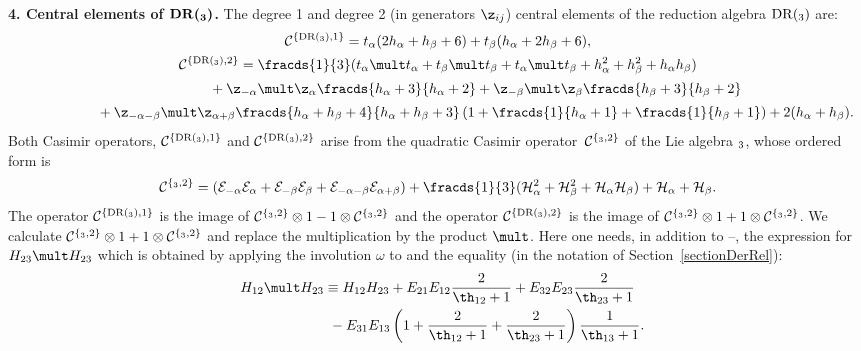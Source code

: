\documentclass[pdftex]{sigma}
\def\a{\alpha}\def\Ar{{\rm A}}\def\Ab{\bar{\rm A}}\def\b{\beta}\def\bb{\mathfrak{b}}
\numberwithin{equation}{section}
\begin{document}
{\bf 4. Central elements of $\boldsymbol{{\mathrm{DR}}(\sl_3)}$.} The degree 1 and degree 2 (in generators $\z_{ij}$) central elements of the
reduction algebra  ${\mathrm{DR}}(\sl_3)$ are:
\begin{gather*}
 {\mathcal{C}}^{\{ {\mathrm{DR}}(\sl_3),1\} }=t_\a (2h_\a +h_\b +6)+t_\b (h_\a +2h_\b +6) ,\\
 {\mathcal{C}}^{\{ {\mathrm{DR}}(\sl_3),2\} }= \fracds{1}{3}(t_\a\mult t_\a +t_\b\mult t_\b+t_\a\mult t_\b +h_\a^2 +h_\b^2 +h_\a h_\b )\\
\phantom{{\mathcal{C}}^{\{ {\mathrm{DR}}(\sl_3),2\} }=}{}
+  \z_{-\a}\mult\z_\a \fracds{h_\a +3}{h_\a +2} +\z_{-\b}\mult\z_\b \fracds{h_\b +3}{h_\b +2}\\
\phantom{{\mathcal{C}}^{\{ {\mathrm{DR}}(\sl_3),2\} }=}{}  +  \z_{-\a -\b}\mult\z_{\a +\b} \fracds{h_\a +h_\b +4}{h_\a +h_\b +3}
\left( 1+ \fracds{1}{h_\a +1}+ \fracds{1}{h_\b +1}\right) +2(h_\a +h_\b ) .
\end{gather*}
Both Casimir operators, $ {\mathcal{C}}^{\{ {\mathrm{DR}}(\sl_3),1\} }$ and ${\mathcal{C}}^{\{ {\mathrm{DR}}(\sl_3),2\} }$ arise from the quadratic Casimir operator~${\mathcal{C}}^{\{ \sl_3,2\} }$ of the Lie algebra $\sl_3$, whose ordered form is
\begin{gather*}
  {\mathcal{C}}^{\{ \sl_3,2\} }=({\mathcal{E}}_{-\a}{\mathcal{E}}_\a +{\mathcal{E}}_{-\b}{\mathcal{E}}_\b +{\mathcal{E}}_{-\a -\b}{\mathcal{E}}_{\a +\b})
+\fracds{1}{3}({\mathcal{H}}_\a^2+{\mathcal{H}}_\b^2+{\mathcal{H}}_\a {\mathcal{H}}_\b)+{\mathcal{H}}_\a +{\mathcal{H}}_\b .
\end{gather*}
The operator ${\mathcal{C}}^{\{ {\mathrm{DR}}(\sl_3),1\} }$ is the image of ${\mathcal{C}}^{\{ \sl_3,2\} }\otimes 1-1\otimes {\mathcal{C}}^{\{ \sl_3,2\} }$ and
the operator ${\mathcal{C}}^{\{ {\mathrm{DR}}(\sl_3),2\} }$ is the image of ${\mathcal{C}}^{\{ \sl_3,2\} }\otimes 1+1\otimes {\mathcal{C}}^{\{ \sl_3,2\} }$.
We calculate ${\mathcal{C}}^{\{ \sl_3,2\} }\otimes 1+1\otimes {\mathcal{C}}^{\{ \sl_3,2\} }$
and replace the multiplication by the product $\mult$.
Here one needs, in addition to --, the expression for $H_{23}\mult H_{23}$ which is obtained by
applying the involution $\omega$ to   and the equality (in the notation of Section~\ref{sectionDerRel}):
\begin{gather*}
H_{12}\mult H_{23}\equiv  H_{12}H_{23}+E_{21}E_{12} \frac{2}{\th_{12} +1}+E_{32}E_{23} \frac{2}{\th_{23} +1}\nonumber\\
\phantom{H_{12}\mult H_{23}\equiv}{} -  E_{31}E_{13}\left(1+\frac{2}{\th_{12} +1}+\frac{2}{\th_{23} +1}\right)\frac{1}{\th_{13}+1} .
\end{gather*}
\end{document}

